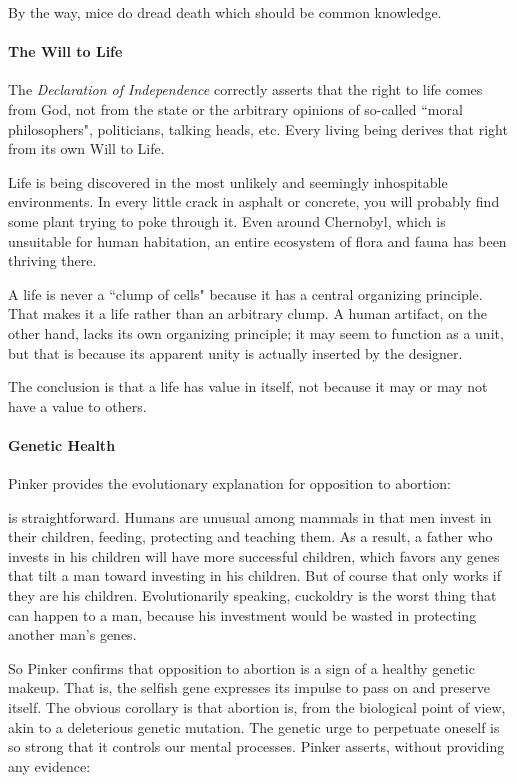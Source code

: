 By the way, mice do dread death which should be common knowledge.

\paragraph{The Will to Life}
The \emph{Declaration of Independence} correctly asserts that the right to life comes from God, not from the state or the arbitrary opinions of so-called ``moral philosophers", politicians, talking heads, etc. Every living being derives that right from its own Will to Life.

Life is being discovered in the most unlikely and seemingly inhospitable environments. In every little crack in asphalt or concrete, you will probably find some plant trying to poke through it. Even around Chernobyl, which is unsuitable for human habitation, an entire ecosystem of flora and fauna has been thriving there.

A life is never a ``clump of cells" because it has a central organizing principle. That makes it a life rather than an arbitrary clump. A human artifact, on the other hand, lacks its own organizing principle; it may seem to function as a unit, but that is because its apparent unity is actually inserted by the designer.

The conclusion is that a life has value in itself, not because it may or may not have a value to others.

\paragraph{Genetic Health}
Pinker provides the evolutionary explanation for opposition to abortion:

\begin{quotex}
[It] is straightforward. Humans are unusual among mammals in that men invest in their children, feeding, protecting and teaching them. As a result, a father who invests in his children will have more successful children, which favors any genes that tilt a man toward investing in his children. But of course that only works if they are his children. Evolutionarily speaking, cuckoldry is the worst thing that can happen to a man, because his investment would be wasted in protecting another man's genes. 

\end{quotex}
So Pinker confirms that opposition to abortion is a sign of a healthy genetic makeup. That is, the selfish gene expresses its impulse to pass on and preserve itself. The obvious corollary is that abortion is, from the biological point of view, akin to a deleterious genetic mutation. The genetic urge to perpetuate oneself is so strong that it controls our mental processes. Pinker asserts, without providing any evidence:

